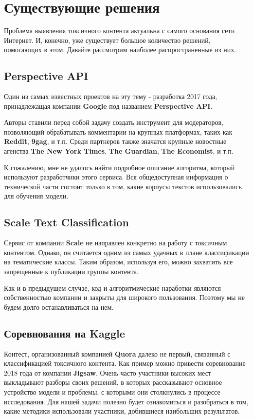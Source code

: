 \section{Существующие решения}

Проблема выявления токсичного контента актуальна с самого основания сети Интернет. И, конечно, уже существует большое количество решений, помогающих в этом. Давайте рассмотрим наиболее распространенные из них.
 
\subsection{Perspective API}
  
Один из самых известных проектов на эту тему - разработка 2017 года, принадлежащая компании \textbf{Google} под названием \textbf{Perspective API}.

Авторы ставили перед собой задачу создать инструмент для модераторов, позволяющий обрабатывать комментарии на крупных платформах, таких как \textbf{Reddit}, \textbf{9gag}, и т.п. Среди партнеров также значатся крупные новостные агенства \textbf{The New York Times}, \textbf{The Guardian}, \textbf{The Economist}, и т.п.

К сожалению, мне не удалось найти подробное описание алгоритма, который используют разработчики этого сервиса. Вся общедоступная информация о технической части состоит только в том, какие корпусы текстов использовались для обучения модели.

\subsection{Scale Text Classification}

Сервис от компании \textbf{Scale} не направлен конкретно на работу с токсичным контентом. Однако, он считается одним из самых удачных в плане классификации на тематические классы. Таким образом, используя его, можно захватить все запрещенные к публикации группы контента.

Как и в предыдущем случае, код и алгоритмические наработки являются собственностью компании и закрыты для широкого пользования. Поэтому мы не будем долго останавливаться на нем.

\subsection{Соревнования на Kaggle}

Контест, организованный компанией \textbf{Quora} далеко не первый, связанный с классификацией токсичного контента. Как пример можно привести соревнование 2018 года от компании \textbf{Jigsaw}. Очень часто участники высоких мест выкладывают разборы своих решений, в которых рассказывают основное устройство модели и проблемы, с которыми они столкнулись в процессе исследования. Для нашей задачи полезно будет ознакомиться и разобраться в том, какие методики использовали участники, добившиеся наибольших результатов.

